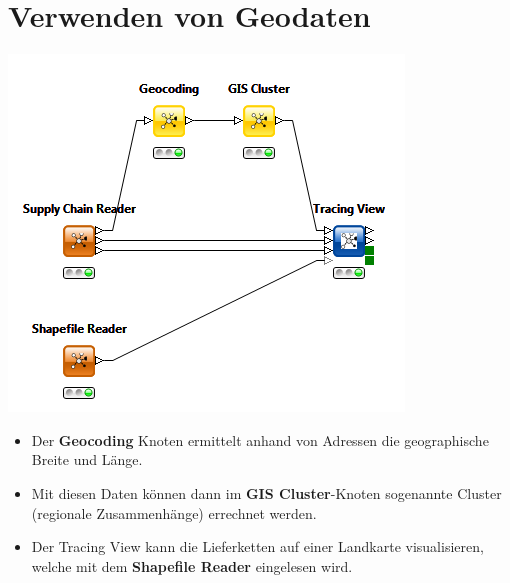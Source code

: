 \documentclass{beamer}
\begin{document}
\section{Verwenden von Geodaten}
\begin{frame}
	\begin{center}
  		\includegraphics[height=0.5\textheight]{3.png}
	\end{center}
	\begin{itemize}
		\item Der \textbf{Geocoding} Knoten ermittelt anhand von Adressen die geographische Breite und Länge.
		\item Mit diesen Daten können dann im \textbf{GIS Cluster}-Knoten sogenannte Cluster (regionale Zusammenhänge) errechnet werden.
		\item Der Tracing View kann die Lieferketten auf einer Landkarte visualisieren, welche mit dem \textbf{Shapefile Reader} eingelesen wird.
	\end{itemize}		
\end{frame}
\end{document}
